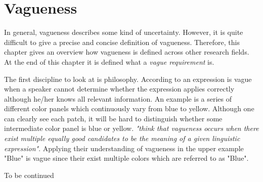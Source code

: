 \section{Vagueness}
\label{chp:fundamentals:sec:vagueness}
In general, vagueness describes some kind of uncertainty.
However, it is quite difficult to give a precise and concise definition of vagueness.
Therefore, this chapter gives an overview how vagueness is defined across other research fields.
At the end of this chapter it is defined what a \textit{vague requirement} is.

The first discipline to look at is philosophy.
According to \textcite{Braun:2007} an expression is vague when a speaker cannot determine whether the expression applies correctly although he/her knows all relevant information.
An example is a series of different color panels which continuously vary from blue to yellow.
Although one can clearly see each patch, it will be hard to distinguish whether some intermediate color panel is blue or yellow.
\textcite{Braun:2007} \textit{"think that vagueness occurs when there exist multiple equally good candidates to be the meaning of a given linguistic expression"}.
Applying their understanding of vagueness in the upper example "Blue" is vague since their exist multiple colors which are referred to as "Blue".

To be continued
